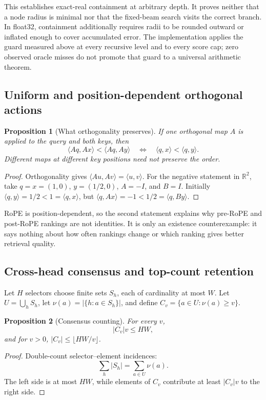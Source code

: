 \documentclass[11pt]{article}
\numberwithin{equation}{section}
\newtheorem{proposition}{Proposition}
\newcommand{\R}{\mathbb{R}}
\newcommand{\inner}[2]{\langle #1, #2\rangle}
\begin{document}
This establishes exact-real containment at arbitrary depth. It proves neither that a node radius is minimal
nor that the fixed-beam search visits the correct branch. In float32, containment additionally requires radii
to be rounded outward or inflated enough to cover accumulated error. The implementation applies the guard
measured above at every recursive level and to every score cap; zero observed oracle misses do not promote
that guard to a universal arithmetic theorem.

\subsection{Uniform and position-dependent orthogonal actions}

\begin{proposition}[What orthogonality preserves]\label{prop:app-orthogonal}
If one orthogonal map $A$ is applied to the query and both keys, then
\[
\inner{Aq}{Ax}<\inner{Aq}{Ay}
\quad\Longleftrightarrow\quad
\inner{q}{x}<\inner{q}{y}.
\]
Different maps at different key positions need not preserve the order.
\end{proposition}
\begin{proof}
Orthogonality gives $\inner{Au}{Av}=\inner{u}{v}$. For the negative statement in $\R^2$, take
$q=x=(1,0)$, $y=(1/2,0)$, $A=-I$, and $B=I$. Initially
$\inner{q}{y}=1/2<1=\inner{q}{x}$, but
$\inner{q}{Ax}=-1<1/2=\inner{q}{By}$.
\end{proof}

RoPE is position-dependent, so the second statement explains why pre-RoPE and post-RoPE rankings are not
identities. It is only an existence counterexample: it says nothing about how often rankings change or which
ranking gives better retrieval quality.

\subsection{Cross-head consensus and top-count retention}

Let $H$ selectors choose finite sets $S_h$, each of cardinality at most $W$. Let
$U=\bigcup_h S_h$, let $\nu(a)=|\{h:a\in S_h\}|$, and define
$C_v=\{a\in U:\nu(a)\ge v\}$.

\begin{proposition}[Consensus counting]\label{prop:app-consensus-count}
For every $v$,
\[
|C_v|v\le HW,
\]
and for $v>0$, $|C_v|\le\lfloor HW/v\rfloor$.
\end{proposition}
\begin{proof}
Double-count selector--element incidences:
\[
\sum_h|S_h|=\sum_{a\in U}\nu(a).
\]
The left side is at most $HW$, while elements of $C_v$ contribute at least $|C_v|v$ to the right side.
\end{proof}
\end{document}
